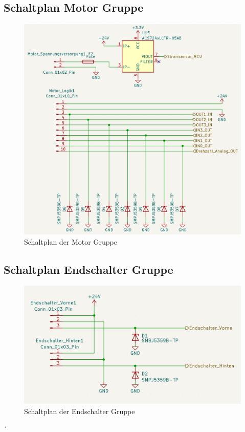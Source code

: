 \subsection{Schaltplan Motor Gruppe}
\begin{figure}[H]
	\centering
	\includegraphics[width=1.0\textwidth]{images/Hardware/Motor_Schaltplan.PNG}
	\caption{Schaltplan der Motor Gruppe}
	\label{fig:MotorGruppe}\begin{center}
	\end{center}
\end{figure}
\subsection{Schaltplan Endschalter Gruppe}
\begin{figure}[H]
	\centering
	\includegraphics[width=1.0\textwidth]{images/Hardware/Endschalter_Schaltplan.PNG}
	\caption{Schaltplan der Endschalter Gruppe}
	\label{fig:EndschalterGruppe}\begin{center}
	\end{center}
\end{figure}´
